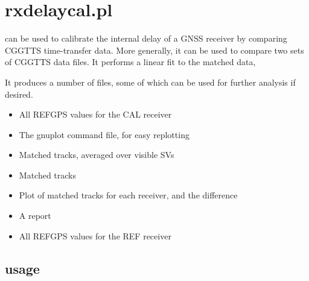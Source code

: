 

\section{rxdelaycal.pl \label{s:rxdelaycal}} 

\hypertarget{h:rxdelaycal}{}

 can be used to calibrate the internal delay of a GNSS receiver by comparing CGGTTS time-transfer data.
More generally, it can be used to compare two sets of CGGTTS data files.
It performs a linear fit to the matched data, 

It produces a number of files, some of which can be used for further analysis if desired.
\begin{itemize}
\item {} All REFGPS values for the CAL receiver
\item {} The gnuplot command file, for easy replotting
\item {} Matched tracks, averaged over visible SVs
\item {} Matched tracks
\item {} Plot of matched tracks for each receiver, and the difference
\item {} A report 
\item {} All REFGPS values for the REF receiver
\end{itemize}

\subsection{usage}


